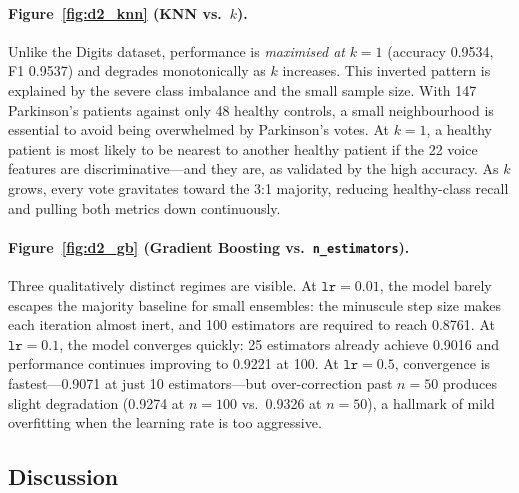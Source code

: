 \documentclass[11pt,letterpaper]{article}
\begin{document}
\paragraph{Figure~\ref{fig:d2_knn} (KNN vs.\ $k$).}
Unlike the Digits dataset, performance is \emph{maximised at} $k=1$
(accuracy 0.9534, F1 0.9537) and degrades monotonically as $k$ increases.
This inverted pattern is explained by the severe class imbalance and the small
sample size.  With 147 Parkinson's patients against only 48 healthy controls,
a small neighbourhood is essential to avoid being overwhelmed by Parkinson's
votes.  At $k=1$, a healthy patient is most likely to be nearest to another
healthy patient if the 22 voice features are discriminative---and they are,
as validated by the high accuracy.  As $k$ grows, every vote gravitates
toward the 3:1 majority, reducing healthy-class recall and pulling both
metrics down continuously.

\paragraph{Figure~\ref{fig:d2_gb} (Gradient Boosting vs.\
\texttt{n\_estimators}).}
Three qualitatively distinct regimes are visible.  At $\texttt{lr}=0.01$, the
model barely escapes the majority baseline for small ensembles: the minuscule
step size makes each iteration almost inert, and 100 estimators are required
to reach 0.8761.  At $\texttt{lr}=0.1$, the model converges quickly: 25
estimators already achieve 0.9016 and performance continues improving to
0.9221 at 100.  At $\texttt{lr}=0.5$, convergence is fastest---0.9071 at
just 10 estimators---but over-correction past $n=50$ produces slight
degradation (0.9274 at $n=100$ vs.\ 0.9326 at $n=50$), a hallmark of
mild overfitting when the learning rate is too aggressive.

\subsection{Discussion}
\end{document}

